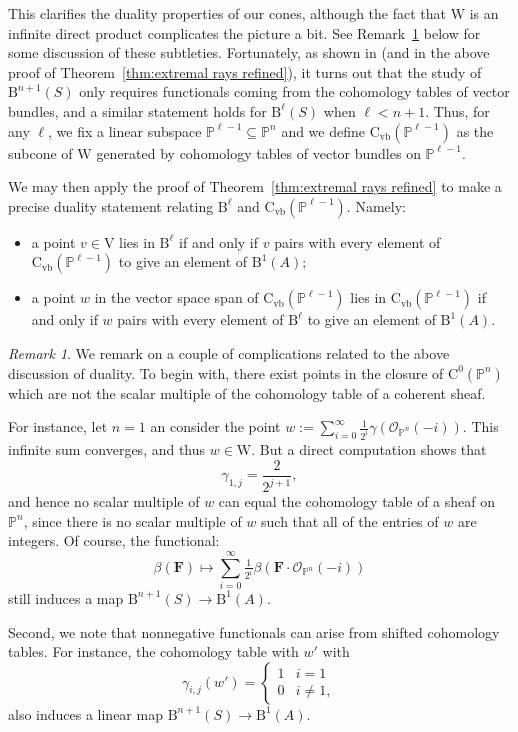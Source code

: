 \documentclass[12pt]{amsart}
\theoremstyle{definition}
\theoremstyle{remark}
\newtheorem{remark}[lemma]{Remark}
\newcommand{\PP}{\mathbb{P}}
\newcommand{\VV}{\mathrm{V}}
\newcommand{\WW}{\mathrm{W}}
\newcommand{\cO}{\mathcal{O}}
\newcommand{\FF}{\mathbf{F}}
\newcommand{\CQ}{\mathrm{C}}
\newcommand{\CvbQ}{\mathrm{C}_{\text{vb}}}
\newcommand{\BBQ}{\mathrm{B}}
\begin{document}
This clarifies the duality properties of our cones, although the fact that $\WW$ is an infinite direct product complicates the picture a bit.  See Remark~\ref{rmk:issues}  below for some discussion of these subtleties.  Fortunately, as shown in \cite{eis-schrey1} (and in the above proof of Theorem~\ref{thm:extremal rays refined}), it turns out that the study of $\BBQ^{n+1}(S)$ only requires functionals coming from the cohomology tables of vector bundles, and a similar statement holds for $\BBQ^{\ell}(S)$ when $\ell<n+1$.  Thus, for any $\ell$, we fix a linear subspace $\PP^{\ell-1}\subseteq \PP^n$ and we define $\CvbQ(\PP^{\ell-1})$ as the subcone of $\WW$ generated by cohomology tables of vector bundles on $\PP^{\ell-1}$.

We may then apply the proof of Theorem~\ref{thm:extremal rays refined} to make a precise duality statement relating $\BBQ^{\ell}$ and $\CvbQ(\PP^{\ell-1})$.  Namely:
\begin{itemize}
	\item a point $v\in \VV$ lies in $\BBQ^{\ell}$ if and only if $v$ pairs with every element of $\CvbQ(\PP^{\ell-1})$ to give an element of $\BBQ^1(A)$;
	\item a point $w$ in the vector space span of $\CvbQ(\PP^{\ell-1})$ lies in $\CvbQ(\PP^{\ell-1})$ if and only if $w$ pairs with every element of $\BBQ^{\ell}$ to give an element of $\BBQ^1(A)$.
\end{itemize}


\begin{remark}\label{rmk:issues}
We remark on a couple of complications related to the above discussion of duality.  To begin with, there exist points in the closure of $\CQ^0(\PP^n)$ which are not the scalar multiple of the cohomology table of a coherent sheaf.   

For instance, let $n=1$ an consider the point $w:=\sum_{i=0}^\infty \frac{1}{2^i} \gamma(\cO_{\PP^n}(-i))$.  
This infinite sum converges, and thus $w\in \WW$.  But a direct computation shows that
\[
\gamma_{1,j}=\frac{2}{2^{j+1}},
\]
and hence no scalar multiple of $w$ can equal the cohomology table of a sheaf on $\PP^n$, since there is no scalar multiple of $w$ such that all of the entries of $w$ are integers.  Of course, the functional:
\[
\beta(\FF)\mapsto \sum_{i=0}^\infty \tfrac{1}{2^i} \beta(\FF\cdot \cO_{\PP^n}(-i))
\]
still induces a map $\BBQ^{n+1}(S)\to \BBQ^1(A)$.

Second, we note that nonnegative functionals can arise from shifted cohomology tables.  For instance, the cohomology table with $w'$ with 
\[
\gamma_{i,j}(w')=\begin{cases}
1&i=1\\
0&i\ne 1,
\end{cases}
\]
also induces a linear map $\BBQ^{n+1}(S)\to \BBQ^1(A)$.
\end{remark}
\end{document}
